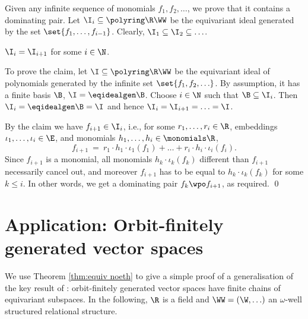 Given any infinite sequence of monomials $f_1, f_2, \ldots$, we prove that it contains a dominating pair. %
Let $\I_i %
\subseteq \polyring \R \WW$ 
be the equivariant ideal generated  by the set $\set{f_1, \ldots, f_{i-1}}$.
Clearly, $\I_1 \subseteq \I_2 \subseteq \ldots$.
%
\begin{claim}
$\I_i = \I_{i+1}$ for some $i\in\N$.
\end{claim}
%
To prove the claim, let $\I \subseteq \polyring \R \WW$  be the equivariant ideal of polynomials generated by 
the infinite set $\set{f_1, f_2, \ldots}$.
By assumption, it has a finite basis $\B$, $\I = \eqidealgen \B$.
Choose $i\in\N$ such that  $\B \subseteq \I_i$.
Then $\I_i = \eqidealgen \B = \I$ and hence $\I_i = \I_{i+1} = \ldots = \I$.

\smallskip

By the claim we have $f_{i+1} \in \I_{i}$, i.e., 
for some $r_1, \ldots, r_{i}\in\R$, embeddings $\iota_1, \ldots, \iota_{i}\in\E$, 
and monomials $h_1, \ldots, h_{i}\in\monomials \R$,
\[
f_{i+1} \ = \ r_1 \cdot h_1 \cdot \iota_1(f_1) + \ldots + r_{i} \cdot h_{i} \cdot \iota_{i}(f_{i}).
\]
Since $f_{i+1}$ is a monomial, all monomials $h_k \cdot \iota_k(f_k)$ different than $f_{i+1}$ 
necessarily
cancel out, and moreover $f_{i+1}$ has to be equal to $h_k \cdot \iota_k(f_k)$ for some $k\leq i$. 
In other words, we get a dominating pair $f_k \wpo f_{i+1}$,
as required.
\qed



\section{Application: Orbit-finitely generated vector spaces} 
\label{sec:lin}

We use Theorem \ref{thm:equiv noeth} to give a simple proof of 
a generalisation of the key result of \cite{BKM21}:
orbit-finitely generated vector spaces have finite chains of equivariant subspaces.
In the following, $\R$ is a field and $\WW = (\W, \ldots)$ an $\omega$-well structured 
relational structure.


